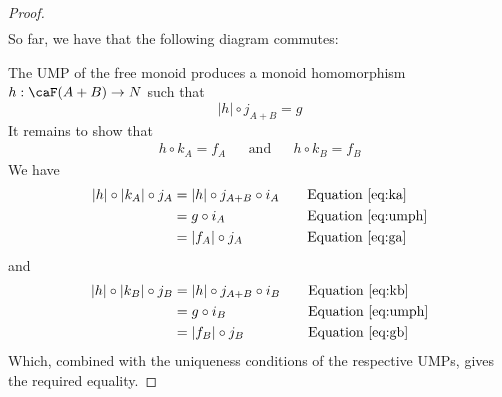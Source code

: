 \documentclass[a5paper]{article}
\begin{document}
\begin{proof}
\begin{align}
  \end{align}
  So far, we have that the following diagram commutes:
  \begin{center}
  \end{center}
  The UMP of the free monoid produces a monoid homomorphism $h:\caF(A+B)\to N$
  such that
  \begin{equation}\label{eq:umph}
    |h|\circ j_{A+B}=g
  \end{equation}
  It remains to show that
  \begin{align*}
    h\circ k_A = f_A &&\text{and}&& h\circ k_B = f_B
  \end{align*}
  We have
  \begin{align*}
    |h|\circ |k_A|\circ j_A
    &= |h|\circ j_{A+B}\circ i_A &&\quad\text{Equation \eqref{eq:ka}}\\
    &= g\circ i_A &&\quad\text{Equation \eqref{eq:umph}} \\
    &= |f_A|\circ j_A &&\quad\text{Equation \eqref{eq:ga}}
  \end{align*}
  and
  \begin{align*}
    |h|\circ |k_B|\circ j_B
    &= |h|\circ j_{A+B}\circ i_B &&\quad\text{Equation \eqref{eq:kb}}\\
    &= g\circ i_B &&\quad\text{Equation \eqref{eq:umph}} \\
    &= |f_B|\circ j_B &&\quad\text{Equation \eqref{eq:gb}}
  \end{align*}
  Which, combined with the uniqueness conditions of the respective UMPs, gives
  the required equality.
\end{proof}

\end{document}
